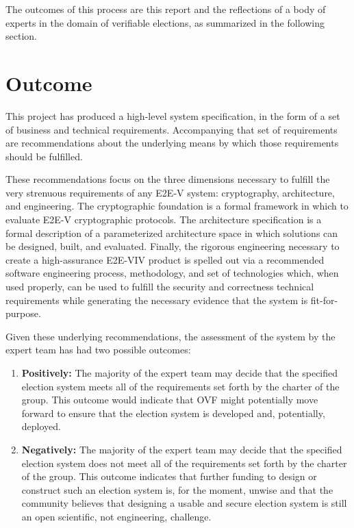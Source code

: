 The outcomes of this process are this report and the reflections of a
body of experts in the domain of verifiable elections, as summarized
in the following section.

\section{Outcome}
\label{sec:outcome}

This project has produced a high-level system specification, in the
form of a set of business and technical requirements.  Accompanying
that set of requirements are recommendations about the underlying
means by which those requirements should be fulfilled.  

These recommendations focus on the three dimensions necessary to
fulfill the very strenuous requirements of any E2E-V system:
cryptography, architecture, and engineering.  The cryptographic
foundation is a formal framework in which to evaluate E2E-V
cryptographic protocols.  The architecture specification is a formal
description of a parameterized architecture space in which solutions
can be designed, built, and evaluated.  Finally, the rigorous
engineering necessary to create a high-assurance E2E-VIV product is
spelled out via a recommended software engineering process,
methodology, and set of technologies which, when used properly, can be
used to fulfill the security and correctness technical requirements
while generating the necessary evidence that the system is
fit-for-purpose.

Given these underlying recommendations, the assessment of the system
by the expert team has had two possible outcomes:
\begin{enumerate}
\item \textbf{Positively:} The majority of the expert team may decide
  that the specified election system meets all of the requirements set
  forth by the charter of the group. This outcome would indicate that
  OVF might potentially move forward to ensure that the election
  system is developed and, potentially, deployed.
\item \textbf{Negatively:} The majority of the expert team may decide
  that the specified election system does not meet all of the
  requirements set forth by the charter of the group. This outcome
  indicates that further funding to design or construct such an
  election system is, for the moment, unwise and that the community
  believes that designing a usable and secure election system is still
  an open scientific, not engineering, challenge.
\end{enumerate}

